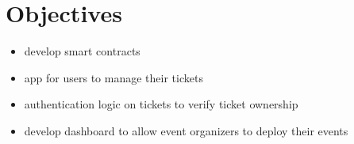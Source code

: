 \section{Objectives}

{\color{red}
\begin{itemize}
    \item develop smart contracts
    \item app for users to manage their tickets
    \item authentication logic on tickets to verify ticket ownership
    \item develop dashboard to allow event organizers to deploy their events
\end{itemize}
}
